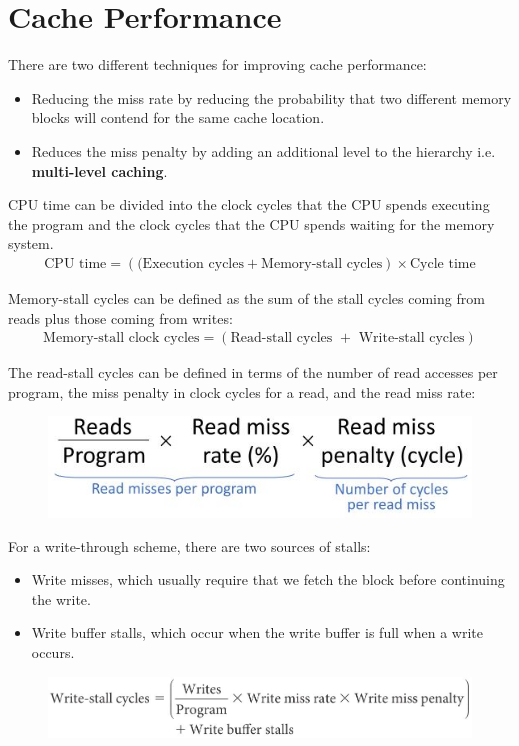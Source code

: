 \documentclass[10pt,a4paper]{article}
\begin{document}
\pagebreak

\section{Cache Performance}

There are two different techniques for improving cache performance:
\begin{itemize}
    \item Reducing the miss rate by reducing the probability that two different memory blocks will contend for the same cache location. 
    \item Reduces the miss penalty by adding an additional level to the hierarchy i.e. \textbf{multi-level caching}.
\end{itemize}

CPU time can be divided into the clock cycles that the CPU spends executing the program and the
clock cycles that the CPU spends waiting for the memory system.
\begin{align*}
    \text{CPU time} = (\text{(Execution cycles}+\text{Memory-stall cycles}) \times \text{Cycle time}
\end{align*}

Memory-stall cycles can be defined as the sum of the stall cycles coming from reads plus those
coming from writes:
\begin{align*}
    \text{Memory-stall clock cycles}=(\text{Read-stall cycles }+\text{ Write-stall cycles})
\end{align*}

The read-stall cycles can be defined in terms of the number of read accesses per program, the miss penalty in clock cycles for a read, and the read miss rate:
\begin{figure} [h!]
    \centering
    \includegraphics[scale=0.5]{eq.JPG}
\end{figure}

For a write-through scheme, there are two sources of stalls:
\begin{itemize}
    \item Write misses, which usually require that we fetch the block before continuing the write.
    \item Write buffer stalls, which occur when the write buffer is full when a write occurs. 
\end{itemize}  
\begin{figure} [h!]
    \centering
    \includegraphics[scale=0.5]{eq1.JPG}
\end{figure}
\end{document}
